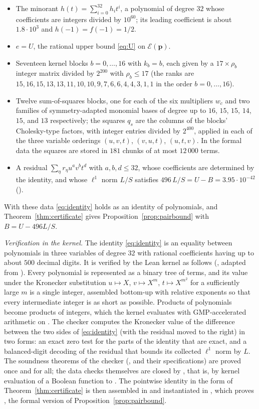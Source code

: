 \documentclass[11pt]{amsart}
\theoremstyle{definition}
\theoremstyle{remark}
\newcommand{\E}{\mathcal{E}}
\newcommand{\cand}{\mathbf{p}}
\begin{document}
\begin{itemize}
\item The minorant $h(t)=\sum_{i=0}^{32}h_i t^{i}$, a polynomial of degree $32$ whose coefficients are integers divided by $10^{60}$; its leading coefficient is about $1.8\cdot10^{3}$ and $h(-1)=f(-1)=1/2$.
\item $e=U$, the rational upper bound \eqref{eq:U} on $\E(\cand)$.
\item Seventeen kernel blocks $b=0,\dots,16$ with $k_b=b$, each given by a $17\times\rho_b$ integer matrix divided by $2^{200}$ with $\rho_b\le17$ (the ranks are $15,16,15,13,13,11,10,10,9,7,6,6,4,4,3,1,1$ in the order $b=0,\dots,16$).
\item Twelve sum-of-squares blocks, one for each of the six multipliers $w_c$ and two families of symmetry-adapted monomial bases of degree up to $16$, $15$, $15$, $14$, $15$, and $13$ respectively; the squares $q_s$ are the columns of the blocks' Cholesky-type factors, with integer entries divided by $2^{400}$, applied in each of the three variable orderings $(u,v,t)$, $(v,u,t)$, $(u,t,v)$. In the formal data the squares are stored in $181$ chunks of at most $12\,000$ terms.
\item A residual $\sum_\eta r_\eta u^{a}v^{b}t^{d}$ with $a,b,d\le32$, whose coefficients are determined by the identity, and whose $\ell^{1}$ norm $L/S$ satisfies $496\,L/S=U-B=3.95\cdot10^{-42}$ ().
\end{itemize}
With these data \eqref{eq:identity} holds as an identity of polynomials, and Theorem~\ref{thm:certificate} gives Proposition~\ref{prop:pairbound} with $B=U-496L/S$.

\emph{Verification in the kernel.} The identity \eqref{eq:identity} is an equality between polynomials in three variables of degree $32$ with rational coefficients having up to about $500$ decimal digits. It is verified by the Lean kernel as follows (, adapted from \cite{ThomsonN9}). Every polynomial is represented as a binary tree of terms, and its value under the Kronecker substitution $u\mapsto X$, $v\mapsto X^{m}$, $t\mapsto X^{m^{2}}$ for a sufficiently large $m$ is a single integer, assembled bottom-up with relative exponents so that every intermediate integer is as short as possible. Products of polynomials become products of integers, which the kernel evaluates with GMP-accelerated arithmetic on . The checker computes the Kronecker value of the difference between the two sides of \eqref{eq:identity} (with the residual moved to the right) in two forms: an exact zero test for the parts of the identity that are exact, and a balanced-digit decoding of the residual that bounds its collected $\ell^{1}$ norm by $L$. The soundness theorems of the checker (,  and their specifications) are proved once and for all; the data checks themselves are closed by , that is, by kernel evaluation of a Boolean function to . The pointwise identity in the form of Theorem~\ref{thm:certificate} is then assembled in  and instantiated in , which proves , the formal version of Proposition~\ref{prop:pairbound}.
\end{document}
